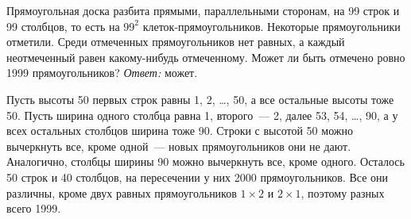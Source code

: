 \problem
Прямоугольная доска разбита прямыми, параллельными сторонам, на 99 строк и 99
столбцов, то есть на $99^2$ клеток-прямо\-у\-голь\-ников.
Некоторые прямоугольники отметили.
Среди отмеченных прямоугольников нет равных, а каждый неотмеченный равен
какому-нибудь отмеченному.
Может ли быть отмечено ровно 1999 прямоугольников?
\solution
\emph{Ответ:} может.
\par
Пусть высоты 50 первых строк равны 1, 2, \ldots, 50, а все остальные высоты
тоже 50.
Пусть ширина одного столбца равна 1, второго~--- 2, далее 53, 54, \ldots, 90, а
у всех остальных столбцов ширина тоже 90.
Строки с высотой 50 можно вычеркнуть все, кроме одной~--- новых прямоугольников
они не дают.
Аналогично, столбцы ширины 90 можно вычеркнуть все, кроме одного.
Осталось 50 строк и 40 столбцов, на пересечении у них 2000 прямоугольников.
Все они различны, кроме двух равных прямоугольников $1 \times 2$ и
$2 \times 1$, поэтому разных всего 1999.
\endproblem 
